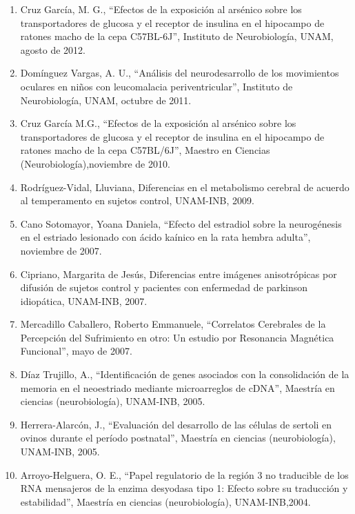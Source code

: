 \begin{enumerate}
\item Cruz García, M. G., “Efectos de la exposición al arsénico sobre los transportadores de glucosa y el receptor de insulina en el 
hipocampo de 
ratones macho de la cepa C57BL-6J”, Instituto de Neurobiología, UNAM, agosto de 2012.

\item Domínguez Vargas, A. U., “Análisis del neurodesarrollo de los movimientos oculares en niños con leucomalacia periventricular”, 
Instituto de 
Neurobiología, UNAM, octubre de 2011.

\item Cruz García M.G., “Efectos de la exposición al arsénico sobre los transportadores de glucosa y el receptor de insulina en el hipocampo 
de 
ratones macho de la cepa C57BL/6J”, Maestro en Ciencias (Neurobiología),noviembre de 2010.

\item Rodríguez-Vidal, Lluviana, Diferencias en el metabolismo cerebral de acuerdo al temperamento en sujetos control, UNAM-INB, 2009.

\item Cano Sotomayor, Yoana Daniela, “Efecto del estradiol sobre la neurogénesis en el estriado lesionado con ácido kaínico en la rata hembra 
adulta”, noviembre de 2007.

\item Cipriano, Margarita de Jesús, Diferencias entre imágenes anisotrópicas por difusión de sujetos control y pacientes con enfermedad de 
parkinson idiopática, UNAM-INB, 2007.

\item Mercadillo Caballero, Roberto Emmanuele, “Correlatos Cerebrales de la Percepción del Sufrimiento en otro: Un estudio por Resonancia 
Magnética 
Funcional”, mayo de 2007.

\item Díaz Trujillo, A., “Identificación de genes asociados con la consolidación de la memoria en el neoestriado mediante microarreglos de 
cDNA”, 
Maestría en ciencias (neurobiología), UNAM-INB, 2005.

\item Herrera-Alarcón, J., “Evaluación del desarrollo de las células de sertoli en ovinos durante el período postnatal”, Maestría en ciencias 
(neurobiología), UNAM-INB, 2005.

\item Arroyo-Helguera, O. E., “Papel regulatorio de la región 3 no traducible de los RNA mensajeros de la enzima desyodasa tipo 1: Efecto 
sobre su 
traducción y estabilidad”, Maestría en ciencias (neurobiología), UNAM-INB,2004.


\end{enumerate}
